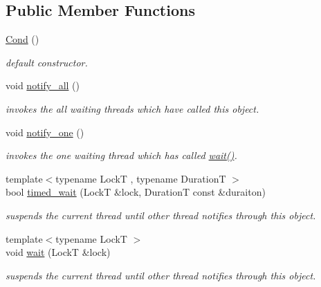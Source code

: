 \subsection*{Public Member Functions}
\begin{DoxyCompactItemize}
\item 
\hyperlink{classhryky_1_1exclusion_1_1_cond_a7bbd3a836576e749c0904e1e327929d0}{Cond} ()
\begin{DoxyCompactList}\small\item\em default constructor. \end{DoxyCompactList}\item 
void \hyperlink{classhryky_1_1exclusion_1_1_cond_a2242452f0deecbf3aa838e72d2e8ec82}{notify\-\_\-all} ()
\begin{DoxyCompactList}\small\item\em invokes the all waiting threads which have called this object. \end{DoxyCompactList}\item 
\hypertarget{classhryky_1_1exclusion_1_1_cond_acec5fdebb28d5061614c2b9dbaf5ee5e}{void \hyperlink{classhryky_1_1exclusion_1_1_cond_acec5fdebb28d5061614c2b9dbaf5ee5e}{notify\-\_\-one} ()}\label{classhryky_1_1exclusion_1_1_cond_acec5fdebb28d5061614c2b9dbaf5ee5e}

\begin{DoxyCompactList}\small\item\em invokes the one waiting thread which has called \hyperlink{classhryky_1_1exclusion_1_1_cond_a55dcfec9c6dfc6e790235465f2951b42}{wait()}. \end{DoxyCompactList}\item 
{\footnotesize template$<$typename Lock\-T , typename Duration\-T $>$ }\\bool \hyperlink{classhryky_1_1exclusion_1_1_cond_aab61983ff7561b9594744f02942a28b6}{timed\-\_\-wait} (Lock\-T \&lock, Duration\-T const \&duraiton)
\begin{DoxyCompactList}\small\item\em suspends the current thread until other thread notifies through this object. \end{DoxyCompactList}\item 
\hypertarget{classhryky_1_1exclusion_1_1_cond_a55dcfec9c6dfc6e790235465f2951b42}{{\footnotesize template$<$typename Lock\-T $>$ }\\void \hyperlink{classhryky_1_1exclusion_1_1_cond_a55dcfec9c6dfc6e790235465f2951b42}{wait} (Lock\-T \&lock)}\label{classhryky_1_1exclusion_1_1_cond_a55dcfec9c6dfc6e790235465f2951b42}

\begin{DoxyCompactList}\small\item\em suspends the current thread until other thread notifies through this object. \end{DoxyCompactList}\end{DoxyCompactItemize}


